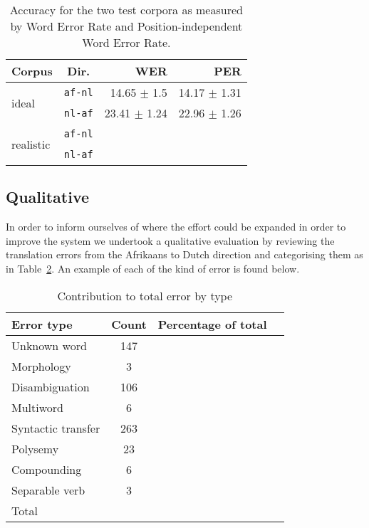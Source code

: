 \documentclass[11pt]{article}
\begin{document}
\begin{table}
  \begin{center}
  \begin{tabular}{|l|c|r|r|}
   \hline
   {\bf Corpus}                & {\bf Dir.}  & {\bf WER}    & {\bf PER}\\
   \hline
   \multirow{2}{*}{ideal}      &  {\small {\tt af-nl}}      & 14.65 $\pm$ 1.5        &  14.17 $\pm$ 1.31 \\ 
                               &  {\small {\tt nl-af}}      & 23.41 $\pm$ 1.24     & 22.96 $\pm$ 1.26 \\
   \hline
   \multirow{2}{*}{realistic}  &  {\small {\tt af-nl}}      &              &  ~ \\ 
                               &  {\small {\tt nl-af}}      &              & ~ \\
   \hline
  \end{tabular}
    \caption{Accuracy for the two test corpora as measured by Word Error Rate 
        and Position-independent Word Error Rate.}
    \label{table:quan}
  \end{center}
\end{table}


\subsection{Qualitative}

In order to inform ourselves of where the effort could be expanded in order to improve the 
system we undertook a qualitative evaluation by reviewing the translation errors from the Afrikaans
to Dutch direction and categorising them as in Table~\ref{table:qual}. An example of each 
of the kind of error is found below.

\begin{table}
  \begin{center}
  \begin{tabular}{|l|c|r|r|}
     \hline
     {\bf Error type}    & {\bf Count} & {\bf Percentage of total} \\
     \hline
     Unknown word        & 147         & \\
     Morphology          & 3           & \\
     Disambiguation      & 106         & \\
     Multiword           & 6           & \\
     Syntactic transfer  & 263         & \\
     Polysemy            & 23          & \\
     Compounding         & 6           & \\
     Separable verb      & 3           & \\
     \hline
     Total               &             & \\
     \hline
  \end{tabular}
    \caption{Contribution to total error by type}
    \label{table:qual}
  \end{center}
\end{table}
\end{document}
